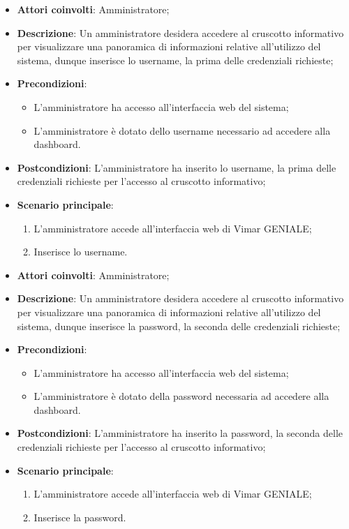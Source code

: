 \begin{itemize}
    \item \textbf{Attori coinvolti}: Amministratore;
    \item \textbf{Descrizione}: Un amministratore desidera accedere al cruscotto informativo per visualizzare una panoramica di informazioni relative all’utilizzo del sistema, dunque inserisce lo username, la prima delle credenziali richieste;
    \item \textbf{Precondizioni}: 
        \begin{itemize}
            \item L’amministratore ha accesso all’interfaccia web del sistema;
            \item L’amministratore è dotato dello username necessario ad accedere alla dashboard.
        \end{itemize}
    \item \textbf{Postcondizioni}: L’amministratore ha inserito lo username, la prima delle credenziali richieste per l’accesso al cruscotto informativo;
    \item \textbf{Scenario principale}:
    \begin{enumerate}
    \item L’amministratore accede all’interfaccia web di Vimar GENIALE;
    \item Inserisce lo username.
    \end{enumerate}
\end{itemize}

\begin{itemize}
    \item \textbf{Attori coinvolti}: Amministratore;
    \item \textbf{Descrizione}: Un amministratore desidera accedere al cruscotto informativo per visualizzare una panoramica di informazioni relative all’utilizzo del sistema, dunque inserisce la password, la seconda delle credenziali richieste;
    \item \textbf{Precondizioni}: 
        \begin{itemize}
            \item L’amministratore ha accesso all’interfaccia web del sistema;
            \item L’amministratore è dotato della password necessaria ad accedere alla dashboard.
        \end{itemize}
    \item \textbf{Postcondizioni}: L’amministratore ha inserito la password, la seconda delle credenziali richieste per l’accesso al cruscotto informativo;
    \item \textbf{Scenario principale}:
    \begin{enumerate}
    \item L’amministratore accede all’interfaccia web di Vimar GENIALE;
    \item Inserisce la password.
    \end{enumerate}
\end{itemize}


